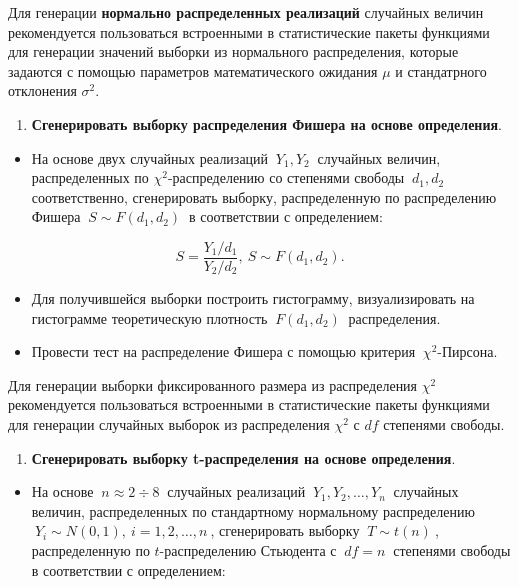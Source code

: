 \documentclass[
]{article}
\providecommand{\tightlist}{%
  \setlength{\itemsep}{0pt}\setlength{\parskip}{0pt}}
\begin{document}
Для генерации \textbf{нормально распределенных реализаций} случайных
величин рекомендуется пользоваться встроенными в статистические пакеты
функциями для генерации значений выборки из нормального распределения,
которые задаются с помощью параметров математического ожидания \(\mu\) и
стандатрного отклонения \(\sigma^2\).

\begin{enumerate}
\def\labelenumi{\arabic{enumi}.}
\setcounter{enumi}{2}
\tightlist
\item
  \textbf{Сгенерировать выборку распределения Фишера на основе
  определения}.
\end{enumerate}

\begin{itemize}
\tightlist
\item
  На основе двух случайных реализаций \(\ Y_1, Y_2\ \) случайных
  величин, распределенных по \(\chi^2\)-распределению со степенями
  свободы \(\ d_1, d_2\ \) соответственно, сгенерировать выборку,
  распределенную по распределению Фишера \(\ S \sim F(d_1, d_2)\ \) в
  соответствии с определением:
\end{itemize}

\[
S = \frac{Y_1 / d_1}{Y_2 / d_2}, \ S\sim F(d_1, d_2).
\]

\begin{itemize}
\item
  Для получившейся выборки построить гистограмму, визуализировать на
  гистограмме теоретическую плотность \(\ F(d_1, d_2)\ \) распределения.
\item
  Провести тест на распределение Фишера с помощью критерия
  \(\ \chi^2\)-Пирсона.
\end{itemize}

Для генерации выборки фиксированного размера из распределения \(\chi^2\)
рекомендуется пользоваться встроенными в статистические пакеты функциями
для генерации случайных выборок из распределения \(\chi^2\) с \(df\)
степенями свободы.

\begin{enumerate}
\def\labelenumi{\arabic{enumi}.}
\setcounter{enumi}{3}
\tightlist
\item
  \textbf{Сгенерировать выборку t-распределения на основе определения}.
\end{enumerate}

\begin{itemize}
\tightlist
\item
  На основе \(\ n \approx 2\div 8\ \) случайных реализаций
  \(\ Y_1, Y_2, \dots, Y_n\ \) случайных величин, распределенных по
  стандартному нормальному распределению
  \(\ Y_i \sim N(0, 1), \ i = 1, 2, \dots, n\ \), сгенерировать выборку
  \(\ T \sim t(n)\ \), распределенную по \(t\)-распределению Стьюдента с
  \(\ df = n\ \) степенями свободы в соответствии с определением:
\end{itemize}
\end{document}
